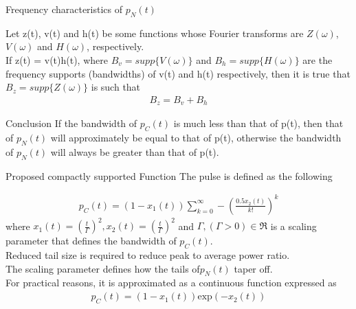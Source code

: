 \documentclass[10pt]{beamer}
\begin{document}
\begin{frame}{Frequency characteristics of $p_{N}(t)$}


\begin{lemma}
Let z(t), v(t) and h(t) be some functions whose Fourier transforms are 
$Z(\omega)$, $V(\omega)$ and $H(\omega)$, respectively. \\
If z(t) = v(t)h(t), where $B_{v} = supp\{V(\omega)\}$ and $B_{h} = supp\{H(\omega)\}$ are the frequency supports (bandwidths) of v(t) and h(t) respectively, then it is true that $B_{z} = supp\{Z(\omega)\}$  is such that
\begin{align}
B_{z} = B_{v} + B_{h}
\end{align}

\end{lemma}
\begin{block}{Conclusion}
If the bandwidth of $p_{C}(t)$ is much less than that of p(t), then
that of $p_{N}(t)$ will approximately be equal to that of p(t), otherwise the bandwidth of $p_{N}(t)$ will always be greater than
that of p(t). 

\end{block}

\end{frame}
\begin{frame}{Proposed compactly supported Function}
The pulse is defined as the following

\begin{align}
p_{C}(t)=(1-x_{1}(t))\sum_{k=0}^{\infty}-\left(\frac{0.5x_{2}(t)}{k!}\right)^{k}
\end{align}
where $x_{1}(t)= (\frac{t}{\Gamma})^{2} , 
x_{2}(t)= (\frac{t}{\Gamma})^{2}$ and $\Gamma ,(\Gamma > 0)\in \mathfrak{R}$ is a
scaling parameter that defines the bandwidth of $p_{C}(t)$.\\
Reduced tail size is required to reduce peak to average power ratio.\\
The scaling parameter defines how the tails of$p_{N}(t)$ taper off.\\
For practical reasons, it is approximated as a continuous function expressed as
\begin{align}
p_{C}(t)=(1-x_{1}(t))\text{exp}(-x_{2}(t))
\end{align}
   
\end{frame}
\end{document}
